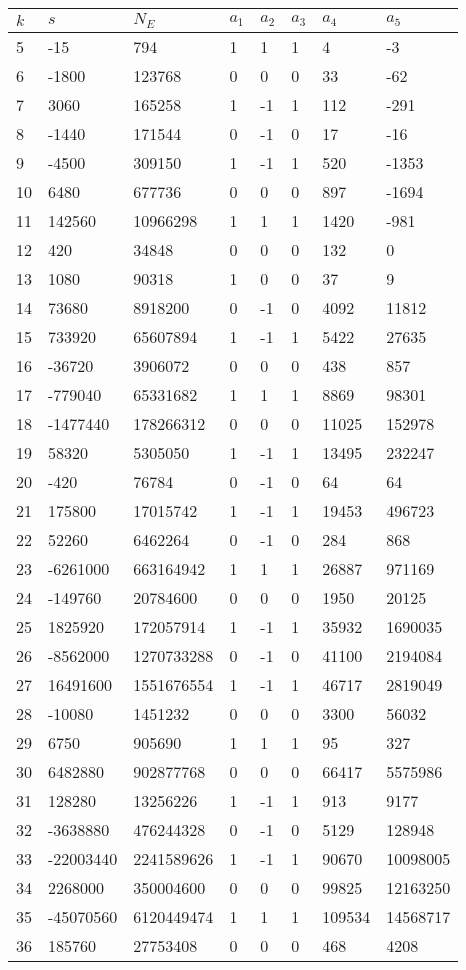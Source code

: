 \documentclass{amsart}
\begin{document}
\begin{longtable}{|l|l|l|lllll|}
\hline
$k$ & $s$ & $N_E$ & $a_1$ & $a_2$ & $a_3$ & $a_4$ & $a_5$\\
\hline
5&-15&794&1&1&1&4&-3\\
6&-1800&123768&0&0&0&33&-62\\
7&3060&165258&1&-1&1&112&-291\\
8&-1440&171544&0&-1&0&17&-16\\
9&-4500&309150&1&-1&1&520&-1353\\
10&6480&677736&0&0&0&897&-1694\\
11&142560&10966298&1&1&1&1420&-981\\
12&420&34848&0&0&0&132&0\\
13&1080&90318&1&0&0&37&9\\
14&73680&8918200&0&-1&0&4092&11812\\
15&733920&65607894&1&-1&1&5422&27635\\
16&-36720&3906072&0&0&0&438&857\\
17&-779040&65331682&1&1&1&8869&98301\\
18&-1477440&178266312&0&0&0&11025&152978\\
19&58320&5305050&1&-1&1&13495&232247\\
20&-420&76784&0&-1&0&64&64\\
21&175800&17015742&1&-1&1&19453&496723\\
22&52260&6462264&0&-1&0&284&868\\
23&-6261000&663164942&1&1&1&26887&971169\\
24&-149760&20784600&0&0&0&1950&20125\\
25&1825920&172057914&1&-1&1&35932&1690035\\
26&-8562000&1270733288&0&-1&0&41100&2194084\\
27&16491600&1551676554&1&-1&1&46717&2819049\\
28&-10080&1451232&0&0&0&3300&56032\\
29&6750&905690&1&1&1&95&327\\
30&6482880&902877768&0&0&0&66417&5575986\\
31&128280&13256226&1&-1&1&913&9177\\
32&-3638880&476244328&0&-1&0&5129&128948\\
33&-22003440&2241589626&1&-1&1&90670&10098005\\
34&2268000&350004600&0&0&0&99825&12163250\\
35&-45070560&6120449474&1&1&1&109534&14568717\\
36&185760&27753408&0&0&0&468&4208\\

\end{longtable}
\end{document}
